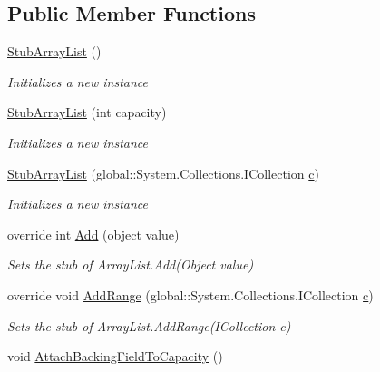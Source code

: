 \subsection*{Public Member Functions}
\begin{DoxyCompactItemize}
\item 
\hyperlink{class_system_1_1_collections_1_1_fakes_1_1_stub_array_list_aa2786593bddbb658f436e0f1511db7bc}{Stub\-Array\-List} ()
\begin{DoxyCompactList}\small\item\em Initializes a new instance\end{DoxyCompactList}\item 
\hyperlink{class_system_1_1_collections_1_1_fakes_1_1_stub_array_list_a9097d56cd38ab9e0d26462861ccf20b3}{Stub\-Array\-List} (int capacity)
\begin{DoxyCompactList}\small\item\em Initializes a new instance\end{DoxyCompactList}\item 
\hyperlink{class_system_1_1_collections_1_1_fakes_1_1_stub_array_list_a8776e7090490251cbedd6dd599b9c546}{Stub\-Array\-List} (global\-::\-System.\-Collections.\-I\-Collection \hyperlink{bootstrap_8min_8js_abce695e0af988ece0826d9ad59b8160d}{c})
\begin{DoxyCompactList}\small\item\em Initializes a new instance\end{DoxyCompactList}\item 
override int \hyperlink{class_system_1_1_collections_1_1_fakes_1_1_stub_array_list_a6936e3f1ac88dbde902b6eea07ac913c}{Add} (object value)
\begin{DoxyCompactList}\small\item\em Sets the stub of Array\-List.\-Add(\-Object value)\end{DoxyCompactList}\item 
override void \hyperlink{class_system_1_1_collections_1_1_fakes_1_1_stub_array_list_a1af294a9336d50439fcd017e97824301}{Add\-Range} (global\-::\-System.\-Collections.\-I\-Collection \hyperlink{bootstrap_8min_8js_abce695e0af988ece0826d9ad59b8160d}{c})
\begin{DoxyCompactList}\small\item\em Sets the stub of Array\-List.\-Add\-Range(\-I\-Collection c)\end{DoxyCompactList}\item 
void \hyperlink{class_system_1_1_collections_1_1_fakes_1_1_stub_array_list_afd7e4b0ccd764e9f7167e6013e544d33}{Attach\-Backing\-Field\-To\-Capacity} ()

\end{DoxyCompactItemize}
